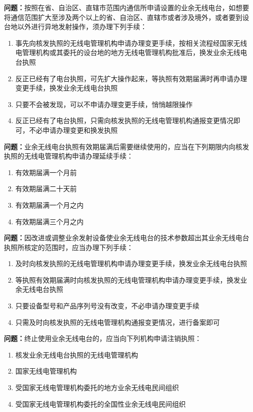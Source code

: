 \bigskip


\noindent\textbf{问题：}按照在省、自治区、直辖市范围内通信所申请设置的业余无线电台，如想要将通信范围扩大至涉及两个以上的省、自治区、直辖市或者涉及境外，或者要到设台地以外进行异地发射操作，须办理下列手续：
\begin{enumerate}[label=\Alph*), leftmargin=3em]
\item 事先向核发执照的无线电管理机构申请办理变更手续，按相关流程经国家无线电管理机构或其委托的设台地的地方无线电管理机构批准后，换发业余无线电台执照
\item 反正已经有了电台执照，可先扩大操作起来，等执照有效期届满时再申请办理变更手续，换发业余无线电台执照
\item 只要不会被发现，可以不申请办理变更手续，悄悄越限操作
\item 反正已经有了电台执照，只需向核发执照的无线电管理机构通报变更情况即可，不必申请办理变更和换发执照
\end{enumerate}

\bigskip


\noindent\textbf{问题：}业余无线电台执照有效期届满后需要继续使用的，应当在下列期限内向核发执照的无线电管理机构申请办理延续手续：
\begin{enumerate}[label=\Alph*), leftmargin=3em]
\item 有效期届满一个月前
\item 有效期届满二十天前
\item 有效期届满一个月之内
\item 有效期届满三个月之内
\end{enumerate}

\bigskip


\noindent\textbf{问题：}因改进或调整业余发射设备使业余无线电台的技术参数超出其业余无线电台执照所核定的范围时，应当办理下列手续：
\begin{enumerate}[label=\Alph*), leftmargin=3em]
\item 及时向核发执照的无线电管理机构申请办理变更手续，换发业余无线电台执照
\item 等执照有效期届满时向核发执照的无线电管理机构申请办理变更手续，换发业余无线电台执照
\item 只要设备型号和产品序列号没有改变，不必申请办理变更手续
\item 只需及时向核发执照的无线电管理机构通报变更情况，进行备案即可
\end{enumerate}

\bigskip


\noindent\textbf{问题：}终止使用业余无线电台的，应当向下列机构申请注销执照：
\begin{enumerate}[label=\Alph*), leftmargin=3em]
\item 核发业余无线电台执照的无线电管理机构
\item 国家无线电管理机构
\item 受国家无线电管理机构委托的地方业余无线电民间组织
\item 受国家无线电管理机构委托的全国性业余无线电民间组织
\end{enumerate}


